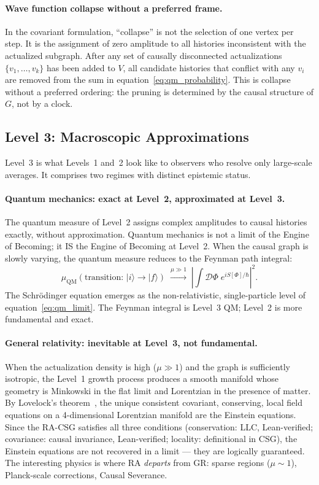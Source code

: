 \documentclass[11pt,a4paper]{article}
\theoremstyle{plain}
\theoremstyle{definition}
\theoremstyle{remark}
\newcommand{\muC}{\mu_{\mathrm{QM}}}   %
\begin{document}
\paragraph{Wave function collapse without a preferred frame.}
In the covariant formulation, ``collapse'' is not the selection of one vertex
per step. It is the assignment of zero amplitude to all histories inconsistent
with the actualized subgraph. After any set of causally disconnected
actualizations $\{v_1, \ldots, v_k\}$ has been added to $V$, all candidate
histories that conflict with any $v_i$ are removed from the sum in
equation~\eqref{eq:qm_probability}. This is collapse without a preferred
ordering: the pruning is determined by the causal structure of $G$, not by
a clock.

\subsection{Level 3: Macroscopic Approximations}

Level~3 is what Levels~1 and~2 look like to observers who resolve
only large-scale averages. It comprises two regimes with distinct
epistemic status.

\paragraph{Quantum mechanics: exact at Level~2, approximated at Level~3.}
The quantum measure of Level~2 assigns complex amplitudes to causal histories
exactly, without approximation. Quantum mechanics is not a limit of the
Engine of Becoming; it IS the Engine of Becoming at Level~2. When the causal
graph is slowly varying, the quantum measure reduces to the Feynman path
integral:
\begin{equation}
  \muC(\text{transition: } |i\rangle \to |f\rangle)
  \;\xrightarrow{\mu \gg 1}\;
  \left|\int \mathcal{D}\Phi\; e^{iS[\Phi]/\hbar}\right|^2.
  \label{eq:qm_limit}
\end{equation}
The Schr\"{o}dinger equation emerges as the non-relativistic, single-particle
level of equation~\eqref{eq:qm_limit}. The Feynman integral is Level~3 QM;
Level~2 is more fundamental and exact.

\paragraph{General relativity: inevitable at Level~3, not fundamental.}
When the actualization density is high ($\mu \gg 1$) and the graph is
sufficiently isotropic, the Level~1 growth process produces a smooth
manifold whose geometry is Minkowski in the flat limit and Lorentzian in
the presence of matter. By Lovelock's theorem~\citep{Lovelock1971}, the
unique consistent covariant, conserving, local field equations on a
4-dimensional Lorentzian manifold are the Einstein equations. Since the
RA-CSG satisfies all three conditions (conservation: LLC, Lean-verified;
covariance: causal invariance, Lean-verified; locality: definitional in CSG),
the Einstein equations are not recovered in a limit --- they are logically
guaranteed. The interesting physics is where RA \emph{departs} from GR:
sparse regions ($\mu \sim 1$), Planck-scale corrections, Causal Severance.
\end{document}
